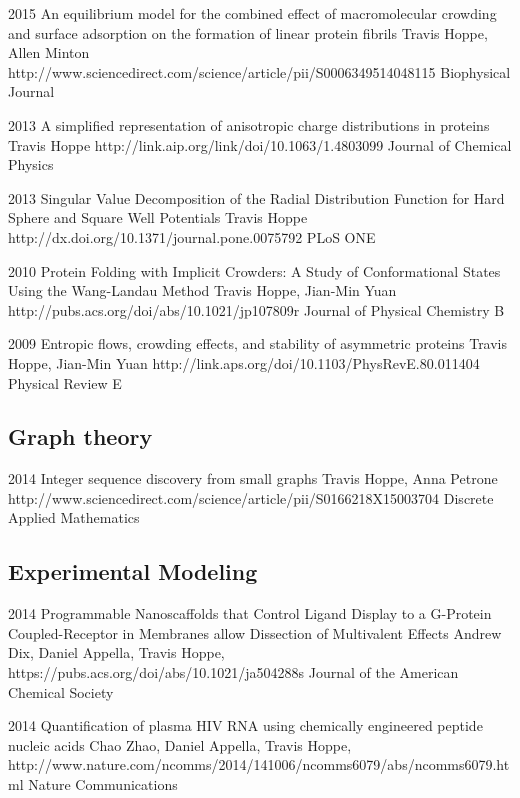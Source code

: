 \documentclass[]{scrartcl}
\begin{document}
\begin{cleanCV}
\Paper
{2015}
{An equilibrium model for the combined effect of macromolecular crowding and surface adsorption on the formation of linear protein fibrils}
{Travis Hoppe, Allen Minton}
{http://www.sciencedirect.com/science/article/pii/S0006349514048115}
{Biophysical Journal}

\Paper
{2013}
{A simplified representation of anisotropic charge distributions in proteins}
{Travis Hoppe}
{http://link.aip.org/link/doi/10.1063/1.4803099}
{Journal of Chemical Physics}

\Paper
{2013}
{Singular Value Decomposition of the Radial Distribution Function 
for Hard Sphere and Square Well Potentials}
{Travis Hoppe}
{http://dx.doi.org/10.1371/journal.pone.0075792}
{PLoS ONE}

\Paper
{2010}
{Protein Folding with Implicit Crowders: 
  A Study of Conformational States Using the Wang-Landau Method}
{Travis Hoppe, Jian-Min Yuan}
{http://pubs.acs.org/doi/abs/10.1021/jp107809r}
{Journal of Physical Chemistry B}


\Paper
{2009}
{Entropic flows, crowding effects, and stability of asymmetric proteins}
{Travis Hoppe, Jian-Min Yuan}
{http://link.aps.org/doi/10.1103/PhysRevE.80.011404}
{Physical Review E}


\subsection{Graph theory}

\Paper
{2014}
{Integer sequence discovery from small graphs}
{Travis Hoppe, Anna Petrone}
{http://www.sciencedirect.com/science/article/pii/S0166218X15003704}
{Discrete Applied Mathematics}

\subsection{Experimental Modeling}

\Paper
{2014}
{Programmable Nanoscaffolds that Control Ligand Display to a G-Protein Coupled-Receptor in Membranes allow Dissection of Multivalent Effects}
{Andrew Dix, Daniel Appella, Travis Hoppe, \etal}
{https://pubs.acs.org/doi/abs/10.1021/ja504288s}
{Journal of the American Chemical Society}

\Paper
{2014}
{Quantification of plasma HIV RNA using chemically engineered peptide nucleic acids}
{Chao Zhao, Daniel Appella, Travis Hoppe, \etal}
{http://www.nature.com/ncomms/2014/141006/ncomms6079/abs/ncomms6079.html}
{Nature Communications}


\end{cleanCV}
\end{document}
